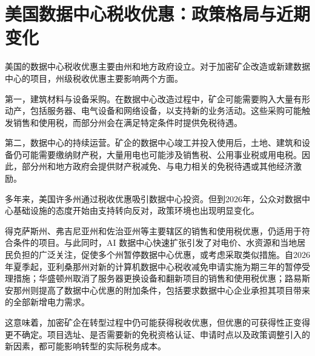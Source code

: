\section{美国数据中心税收优惠：政策格局与近期变化}

美国的数据中心税收优惠主要由州和地方政府设立。对于加密矿企改造或新建数据中心的项目，州级税收优惠主要影响两个方面。

第一，建筑材料与设备采购。在数据中心改造过程中，矿企可能需要购入大量有形动产，包括服务器、电气设备和网络设备，以支持新的业务活动。这些采购可能触发销售和使用税，而部分州会在满足特定条件时提供免税待遇。

第二，数据中心的持续运营。矿企的数据中心竣工并投入使用后，土地、建筑和设备仍可能需要缴纳财产税，大量用电也可能涉及销售税、公用事业税或用电税。因此，部分州和地方政府会提供财产税减免、与电力相关的免税待遇或其他经济激励。

多年来，美国许多州通过税收优惠吸引数据中心投资。但到2026年，公众对数据中心基础设施的态度开始由支持转向反对，政策环境也出现明显变化。

得克萨斯州、弗吉尼亚州和佐治亚州等主要辖区的销售和使用税优惠，仍适用于符合条件的项目。与此同时，AI 数据中心快速扩张引发了对电价、水资源和当地居民负担的广泛关注，促使多个州暂停数据中心优惠，或考虑采取类似措施。自2026年夏季起，亚利桑那州对新的计算机数据中心税收减免申请实施为期三年的暂停受理措施；华盛顿州取消了服务器更换设备和翻新项目的销售和使用税优惠；路易斯安那州则提高了数据中心优惠的附加条件，包括要求数据中心企业承担其项目带来的全部新增电力需求。

这意味着，加密矿企在转型过程中仍可能获得税收优惠，但优惠的可获得性正变得更不确定。项目选址、是否需要新的免税资格认证、申请时点以及政策调整引入的新因素，都可能影响转型的实际税务成本。



\FloatBarrier
